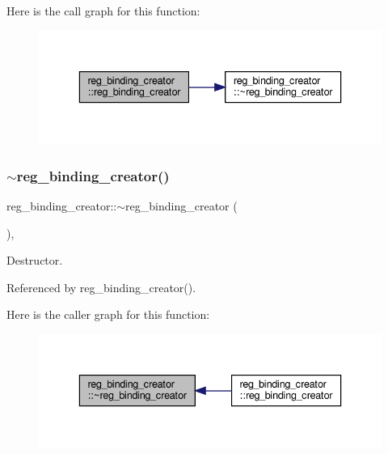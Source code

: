 Here is the call graph for this function\+:
\nopagebreak
\begin{figure}[H]
\begin{center}
\leavevmode
\includegraphics[width=336pt]{d8/d7c/classreg__binding__creator_a2bb802408ad2ffe32277d65edf50d171_cgraph}
\end{center}
\end{figure}
\mbox{\label{classreg__binding__creator_a073339d21f4163ffff97540b2a787281}} 
\subsubsection{\texorpdfstring{$\sim$reg\+\_\+binding\+\_\+creator()}{~reg\_binding\_creator()}}
{\footnotesize\ttfamily reg\+\_\+binding\+\_\+creator\+::$\sim$reg\+\_\+binding\+\_\+creator (\begin{DoxyParamCaption}{ }\end{DoxyParamCaption})\hspace{0.3cm}{\ttfamily [override]}, {\ttfamily [default]}}



Destructor. 



Referenced by reg\+\_\+binding\+\_\+creator().

Here is the caller graph for this function\+:
\nopagebreak
\begin{figure}[H]
\begin{center}
\leavevmode
\includegraphics[width=336pt]{d8/d7c/classreg__binding__creator_a073339d21f4163ffff97540b2a787281_icgraph}
\end{center}
\end{figure}


